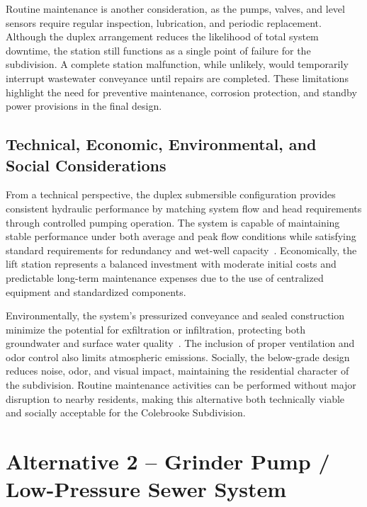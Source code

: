 Routine maintenance is another consideration, as the pumps, valves, and level sensors require regular inspection, lubrication, and periodic replacement. Although the duplex arrangement reduces the likelihood of total system downtime, the station still functions as a single point of failure for the subdivision. A complete station malfunction, while unlikely, would temporarily interrupt wastewater conveyance until repairs are completed. These limitations highlight the need for preventive maintenance, corrosion protection, and standby power provisions in the final design.

\subsection{Technical, Economic, Environmental, and Social Considerations}

From a technical perspective, the duplex submersible configuration provides consistent hydraulic performance by matching system flow and head requirements through controlled pumping operation. The system is capable of maintaining stable performance under both average and peak flow conditions while satisfying standard requirements for redundancy and wet-well capacity~\cite{MDEQ_DesignGuidance_2025,TenStates_RecommendedStandards_2014}. Economically, the lift station represents a balanced investment with moderate initial costs and predictable long-term maintenance expenses due to the use of centralized equipment and standardized components.

Environmentally, the system’s pressurized conveyance and sealed construction minimize the potential for exfiltration or infiltration, protecting both groundwater and surface water quality~\cite{EPA_LiftStation_DesignManual_2004}. The inclusion of proper ventilation and odor control also limits atmospheric emissions. Socially, the below-grade design reduces noise, odor, and visual impact, maintaining the residential character of the subdivision. Routine maintenance activities can be performed without major disruption to nearby residents, making this alternative both technically viable and socially acceptable for the Colebrooke Subdivision.


\section{Alternative 2 – Grinder Pump / Low-Pressure Sewer System}\label{sec:alt2}

